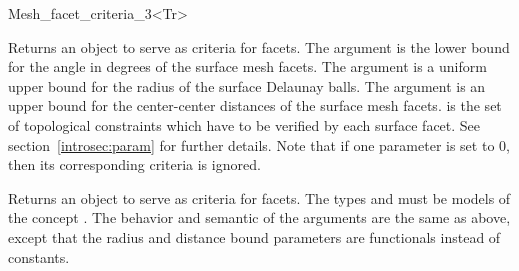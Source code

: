 \begin{ccRefFunctionObjectClass}{Mesh_facet_criteria_3<Tr>}
\ccIsModel
{}


\ccTypes


\ccCreation
{}  %

{Returns an object to serve as criteria for facets. The argument 
 is the lower bound for the angle in degrees of the
surface mesh facets. The argument  is a uniform upper bound
for the radius of the surface Delaunay balls. The argument
 is an upper bound for the center-center distances
of the surface mesh facets.  is the set of topological constraints
which have to be verified by each surface facet. See
section~\ref{introsec:param} for further details.
Note that if one parameter is set to 0, then its corresponding criteria is ignored.}

{Returns an object to serve as criteria for facets. The types  and
 must
be models of the concept . The behavior and semantic of the arguments are the same 
as above, except that the radius and distance bound parameters are functionals instead of constants.}



\ccSeeAlso

 \\
 \\
 \\
 \\
 \\




\end{ccRefFunctionObjectClass}

\ccRefPageEnd
